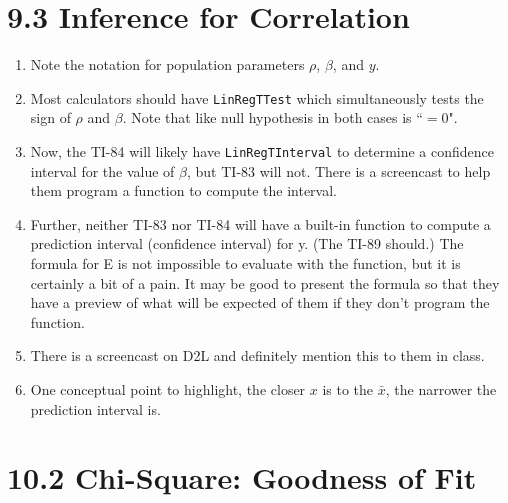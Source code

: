 \documentclass{article}
\begin{document}
\section*{9.3 Inference for Correlation}

\begin{enumerate}

    \item Note the notation for population parameters $\rho$, $\beta$, and  $y$.
    
    \item Most calculators should have \texttt{LinRegTTest} which simultaneously tests the sign of $\rho$ and $\beta$. Note that like null hypothesis in both cases is ``$= 0$".
    
    \item Now, the TI-84 will likely have \texttt{LinRegTInterval} to determine a confidence interval for the value of $\beta$, but TI-83 will not. There is a screencast to help them program a function to compute the interval.
    
    \item Further, neither TI-83 nor TI-84 will have a built-in function to compute a prediction interval (confidence interval) for y. (The TI-89 should.) The formula for E is not impossible to evaluate with the function, but it is certainly a bit of a pain. It may be good to present the formula so that they have a preview of what will be expected of them if they don’t program the function.
    
    \item There is a screencast on D2L and definitely mention this to them in class.
    
    \item One conceptual point to highlight, the closer $x$ is to the $\bar{x}$, the narrower the prediction interval is.

\end{enumerate}

\section*{10.2 Chi-Square: Goodness of Fit}
\end{document}
